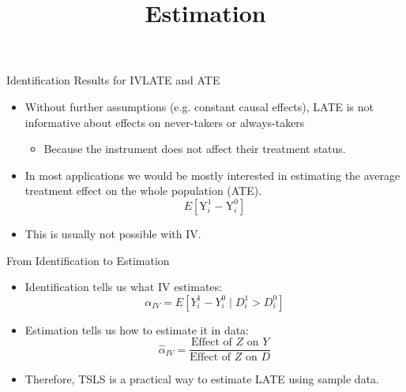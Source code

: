 \documentclass[dvipsnames,hyperref={pdfpagelabels=false}]{beamer}
\begin{document}
\begin{frame}{Identification Results for IV}{LATE and ATE}
	\begin{itemize}
		\item Without further assumptions (e.g. constant causal effects), LATE is not informative about effects on never-takers or always-takers
		\vspace{0.2cm}
		\begin{itemize}
			\item Because the instrument does not affect their treatment status.
			\vspace{0.2cm}
		\end{itemize}
		\item In most applications we would be mostly interested in estimating the average treatment effect on the whole population (ATE).
		\begin{equation*}
		E[\mathrm{Y}^{1}_{i}-\mathrm{Y}^{0}_{i}]
		\end{equation*}
		\item This is usually not possible with IV.
	\end{itemize}
\end{frame}








\title[]  
{Estimation}


\author 
{}

\institute{}






\date
{}


\begin{frame}{}
	\titlepage
\end{frame}



\begin{frame}{From Identification to Estimation}
\begin{itemize}
    \item Identification tells us what IV estimates:
    \[
    \alpha_{IV}
    =
    E[Y_i^1-Y_i^0 \mid D_i^1>D_i^0]
    \]
    \item Estimation tells us how to estimate it in data:
    \[
    \hat{\alpha}_{IV}
    =
    \frac{\text{Effect of }Z\text{ on }Y}
    {\text{Effect of }Z\text{ on }D}
    \]
    \item Therefore, TSLS is a practical way to estimate LATE using sample data.
\end{itemize}
\end{frame}
\end{document}
